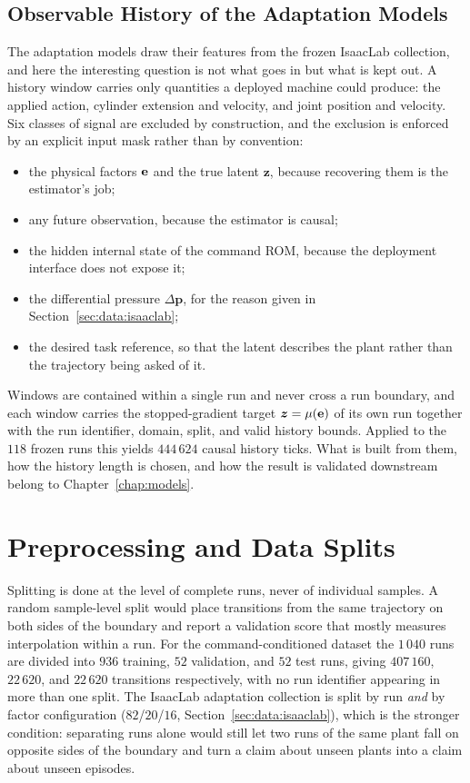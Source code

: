 \subsection{Observable History of the Adaptation Models}
\label{sec:data:history-features}

The adaptation models draw their features from the frozen IsaacLab
collection, and here the interesting question is not what goes in but
what is kept out. A history window carries only quantities a deployed
machine could produce: the applied action, cylinder extension and
velocity, and joint position and velocity. Six classes of signal are
excluded by construction, and the exclusion is enforced by an explicit
input mask rather than by convention:

\begin{itemize}
  \item the physical factors $\mathbf{e}$ and the true latent $\bm{z}$,
    because recovering them is the estimator's job;
  \item any future observation, because the estimator is causal;
  \item the hidden internal state of the command ROM, because the
    deployment interface does not expose it;
  \item the differential pressure $\Delta\bm{p}$, for the reason given
    in Section~\ref{sec:data:isaaclab};
  \item the desired task reference, so that the latent describes the
    plant rather than the trajectory being asked of it.
\end{itemize}

Windows are contained within a single run and never cross a run
boundary, and each window carries the stopped-gradient target
$\bm{z} = \mu(\mathbf{e})$ of its own run together with the run
identifier, domain, split, and valid history bounds. Applied to the
$118$ frozen runs this yields $444\,624$ causal history ticks. What is
built from them, how the history length is chosen, and how the result is
validated downstream belong to Chapter~\ref{chap:models}.

\section{Preprocessing and Data Splits}
\label{sec:data:preprocessing}

Splitting is done at the level of complete runs, never of individual
samples. A random sample-level split would place transitions from the
same trajectory on both sides of the boundary and report a validation
score that mostly measures interpolation within a run. For the
command-conditioned dataset the $1\,040$ runs are divided into $936$
training, $52$ validation, and $52$ test runs, giving $407\,160$,
$22\,620$, and $22\,620$ transitions respectively, with no run
identifier appearing in more than one split. The IsaacLab adaptation
collection is split by run \emph{and} by factor configuration
($82$/$20$/$16$, Section~\ref{sec:data:isaaclab}), which is the stronger
condition: separating runs alone would still let two runs of the same
plant fall on opposite sides of the boundary and turn a claim about
unseen plants into a claim about unseen episodes.


